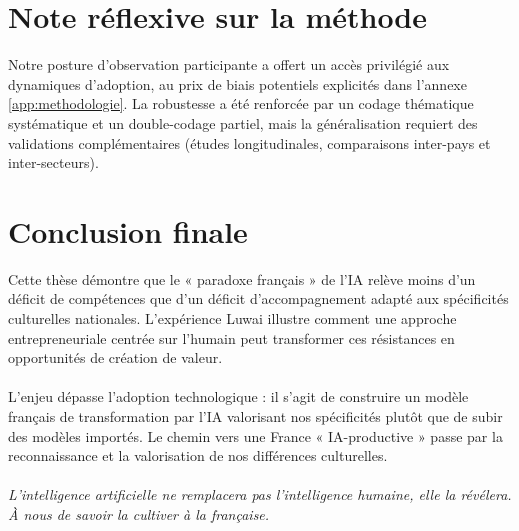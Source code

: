 \section{Note réflexive sur la méthode}
Notre posture d’observation participante a offert un accès privilégié aux dynamiques d’adoption, au prix de biais potentiels explicités dans l’annexe \ref{app:methodologie}. La robustesse a été renforcée par un codage thématique systématique et un double-codage partiel, mais la généralisation requiert des validations complémentaires (études longitudinales, comparaisons inter-pays et inter-secteurs).

\section{Conclusion finale}

Cette thèse démontre que le « paradoxe français » de l’IA relève moins d’un déficit de compétences que d’un déficit d’accompagnement adapté aux spécificités culturelles nationales. L’expérience Luwai illustre comment une approche entrepreneuriale centrée sur l’humain peut transformer ces résistances en opportunités de création de valeur.
\\\\
L’enjeu dépasse l’adoption technologique : il s’agit de construire un modèle français de transformation par l’IA valorisant nos spécificités plutôt que de subir des modèles importés. Le chemin vers une France « IA-productive » passe par la reconnaissance et la valorisation de nos différences culturelles.
\\\\
\emph{L’intelligence artificielle ne remplacera pas l’intelligence humaine, elle la révélera. À nous de savoir la cultiver à la française.}
